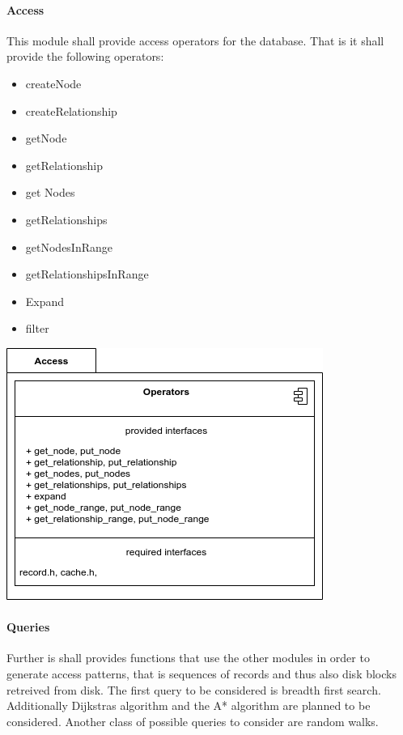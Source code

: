 			
			\paragraph{Access}
				This module shall provide access operators for the database. That is it shall provide the following operators:
				\begin{itemize}
				 \item createNode
				 \item createRelationship
				 \item getNode
				 \item getRelationship
				 \item get Nodes
				 \item getRelationships
				 \item getNodesInRange
				 \item getRelationshipsInRange
				 \item Expand
				 \item filter
				\end{itemize}
                
                \includegraphics[keepaspectratio, width=\textwidth]{img/access_arch.png} \\


			
			\paragraph{Queries}
                Further is shall provides functions that use the other modules in order to generate access patterns, that is sequences of records and thus also disk blocks retreived from disk.
                The first query to be considered is breadth first search. Additionally Dijkstras algorithm and the A* algorithm are planned to be considered. Another class of possible queries to consider are random walks.
				
